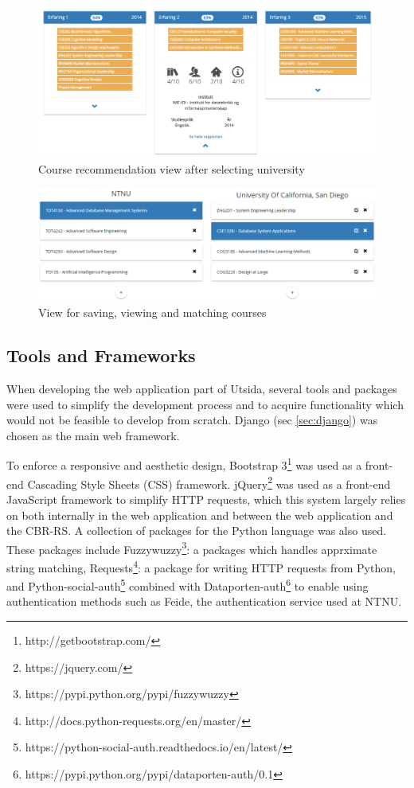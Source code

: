 \begin{figure}[h]
    \centering
    \includegraphics[width=1\textwidth]{fig/utsida_screenshots/result_2_cut_high.png}
    \caption[Course recommendation view]{Course recommendation view after selecting university}
    \label{fig:web_results_2}
\end{figure}

\begin{figure}[H]
    \centering
    \includegraphics[width=1\textwidth]{fig/utsida_screenshots/course_match_cut.png}
    \caption{View for saving, viewing and matching courses}
    \label{fig:web_courses}
\end{figure}

\subsection{Tools and Frameworks}
When developing the web application part of Utsida, several tools and packages were used to simplify the development process and to acquire functionality which would not be feasible to develop from scratch. Django (sec \ref{sec:django}) was chosen as the main web framework.

To enforce a responsive and aesthetic design, Bootstrap 3\footnote{http://getbootstrap.com/} was used as a front-end Cascading Style Sheets (CSS) framework. jQuery\footnote{https://jquery.com/} was used as a front-end JavaScript framework to simplify HTTP requests, which this system largely relies on both internally in the web application and between the web application and the CBR-RS. A collection of packages for the Python language was also used. These packages include Fuzzywuzzy\footnote{https://pypi.python.org/pypi/fuzzywuzzy}: a packages which handles apprximate string matching, Requests\footnote{http://docs.python-requests.org/en/master/}: a package for writing HTTP requests from Python, and Python-social-auth\footnote{https://python-social-auth.readthedocs.io/en/latest/} combined with Dataporten-auth\footnote{https://pypi.python.org/pypi/dataporten-auth/0.1} to enable using authentication methods such as Feide, the authentication service used at NTNU.

